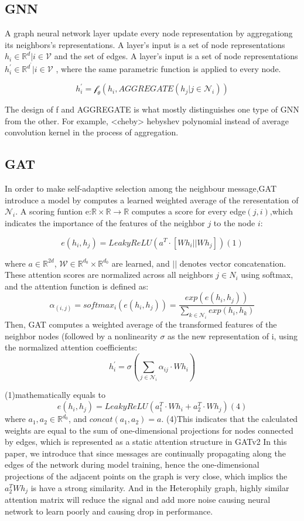 \documentclass[letterpaper]{article} %
\begin{document}
\subsection{GNN }
A graph neural network layer update every node representation by aggregationg its neighbors's representations. A layer's input is a set of node representations ${h_i\in\mathbb{R}^d|i\in\mathcal{V}}$ and the set of edges. A layer's input is a set of node representations ${h^{'}_{i}\in\mathbb{R}^{d^{'}}|i\in\mathcal{V}}$ , where the same parametric function is applied to every node.

$$h_i^{'}=\mathcal{f}_{\theta} (h_i,AGGREGATE({h_j|j\in\mathcal{N}_i}))$$

The design of f and AGGREGATE is what mostly distinguishes one type of GNN from the other. For example, <cheby> hebyshev polynomial instead of average convolution kernel in the process of aggregation.


\subsection{GAT}
In order to make self-adaptive selection among the neighbour message,GAT introduce a model by computes a learned weighted average of the reresentation of $\mathcal{N}_i$. A scoring funtion e:$\mathbb{R}\times\mathbb{R}\to\mathbb{R}$ computes a score for every edge$(j,i)$,which indicates the importance of the features of the neighbor $j$ to the node $i$:

$$e(h_i,h_j)=LeakyReLU(a^T\cdot[Wh_i||Wh_j])  (1)$$

where $a \in \mathbb{R}^{2d}$, $\mathcal{W} \in \mathbb{R}^{d_0}\times\mathbb{R}^{d_0}$ are learned, and $||$ denotes vector concatenation. These attention scores
are normalized across all neighbors $j \in N_i$ using softmax, and the attention function is defined as:
$$\alpha_{(i,j)}=softmax_i(e(h_i,h_j))=\frac{exp(e(h_i,h_j))}{\sum_{k\in\mathcal{N}_i}exp(h_i,h_k)}$$
Then, GAT computes a weighted average of the transformed features of the neighbor nodes (followed
by a nonlinearity $\sigma$ as the new representation of i, using the normalized attention coefficients:
$$h_i^{'}=\sigma(\sum_{j\in\mathcal{N}_i}\alpha_{ij}\cdot Wh_i )$$

(1)mathematically equals to 
$$e(h_i,h_j)=LeakyReLU(a_1^T\cdot Wh_i+a_2^T\cdot Wh_j)  (4)$$
where $a_1,a_2\in \mathbb{R}^{d_0}$, and $concat(a_1,a_2)=a$. (4)This indicates that the calculated weights are equal to the sum of one-dimensional projections for nodes connected by edges, which is represented as a static attention structure in GATv2%
In this paper, we introduce that since messages are continually propagating along the edges of the network during model training, hence the one-dimensional projections of the adjacent points on the graph is very close, which implics the $a_2^TWh_j$ is have a strong similarity. And in the Heterophily graph, highly similar attention matrix will reduce the signal and add more noise causing neural network to learn poorly
and causing drop in performance.
\end{document}
